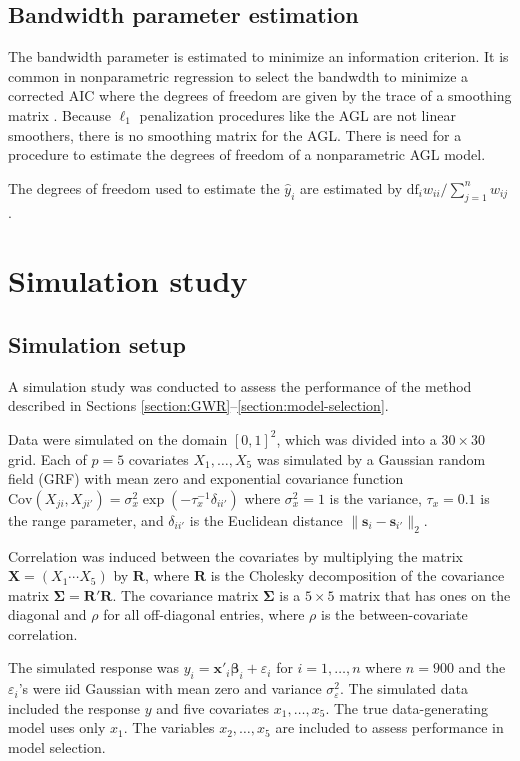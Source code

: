 \documentclass[authoryear, review, 11pt]{elsarticle}
\begin{document}
	\subsection{Bandwidth parameter estimation}
  
  The bandwidth parameter is estimated to minimize an information criterion. It is common in nonparametric regression to select the bandwdth to minimize a corrected AIC where the degrees of freedom are given by the trace of a smoothing matrix \citep{Hurvich:1998}. Because $\ell_1$ penalization procedures like the AGL are not linear smoothers, there is no smoothing matrix for the AGL. There is need for a procedure to estimate the degrees of freedom of a nonparametric AGL model.
  
  The degrees of freedom used to estimate the $\hat{y}_i$ are estimated by $\text{df}_i w_{ii} / \sum_{j=1}^n w_{ij}$.


\section{Simulation study \label{section:simulation}}
	\subsection{Simulation setup}
	A simulation study was conducted to assess the performance of the method described in Sections \ref{section:GWR}--\ref{section:model-selection}. 
	
	Data were simulated on the domain $[0,1]^2$, which was divided into a $30 \times 30$ grid. Each of $p=5$ covariates $X_1, \dots, X_5$ was simulated by a Gaussian random field (GRF) with mean zero and exponential covariance function $\text{Cov} \left(X_{ji}, X_{ji'} \right) = \sigma_x^2 \exp{\left( -\tau_x^{-1} \delta_{ii'} \right)}$ where $\sigma_x^2=1$ is the variance, $\tau_x = 0.1$ is the range parameter, and $\delta_{ii'}$ is the Euclidean distance $\|\bm{s}_i - \bm{s}_{i'}\|_2$.
	
	Correlation was induced between the covariates by multiplying the matrix $\bm{X} = \left(X_1 \cdots X_5\right)$ by $\bm{R}$, where $\bm{R}$ is the Cholesky decomposition of the covariance matrix $\bm{\Sigma} = \bm{R}'\bm{R}$. The covariance matrix $\bm{\Sigma}$ is a $5 \times 5$ matrix that has ones on the diagonal and $\rho$ for all off-diagonal entries, where $\rho$ is the between-covariate correlation.
		
	The simulated response was $y_i = \bm{x}'_i \bm{\beta}_i + \varepsilon_i$ for $i=1, \dots, n$ where $n=900$ and the $\varepsilon_i$'s were iid Gaussian with mean zero and variance $\sigma_\varepsilon^2$. The simulated data included the response $y$ and five covariates $x_1, \dots, x_5$. The true data-generating model uses only $x_1$. The variables $x_2, \dots, x_5$ are included to assess performance in model selection.
	
\end{document}
